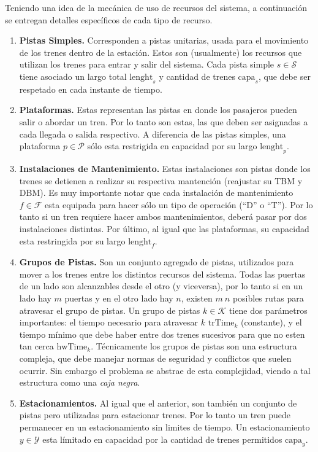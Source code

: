 \documentclass[letter, 10pt]{article}
\begin{document}
\begin{description}
	Teniendo una idea de la mecánica de uso de recursos del sistema, a continuación se entregan detalles específicos de cada tipo de recurso.
	\begin{enumerate}
		\item \textbf{Pistas Simples.} Corresponden a pistas unitarias, usada para el movimiento de los trenes dentro de la estación. Estos son (usualmente) los recursos que utilizan los trenes para entrar y salir del sistema. Cada pista simple $s \in \mathcal{S}$ tiene asociado un largo total $\text{lenght}_s$ y cantidad de trenes $\text{capa}_s$,
		que debe ser respetado en cada instante de tiempo.
		\item \textbf{Plataformas.} Estas representan las pistas en donde los pasajeros pueden salir o abordar un tren. Por lo tanto son estas, las que deben ser asignadas a cada llegada o salida respectivo. A diferencia de las pistas simples, una plataforma $p \in \mathcal{P}$ sólo esta restrigida en capacidad por su largo $\text{lenght}_p$.
		\item \textbf{Instalaciones de Mantenimiento.} Estas instalaciones son pistas donde los trenes se detienen a realizar su respectiva mantención (reajustar su TBM y DBM). Es muy importante notar que cada instalación de mantenimiento $f \in \mathcal{F}$ esta equipada para hacer sólo un tipo de operación (``D'' o ``T''). Por lo tanto si un tren requiere hacer ambos mantenimientos, deberá pasar por dos instalaciones distintas. Por último, al igual que las plataformas, su capacidad esta restringida por su largo $\text{lenght}_f$.
		\item \textbf{Grupos de Pistas.} Son un conjunto agregado de pistas, utilizados para mover a los trenes entre los distintos recursos del sistema. Todas las puertas de un lado son alcanzables desde el otro (y viceversa), por lo tanto si en un lado hay $m$ puertas y en el otro lado hay $n$, existen $m\ n$ posibles rutas para atravesar el grupo de pistas. Un grupo de pistas $k \in \mathcal{K}$ tiene dos parámetros importantes: el tiempo necesario para atravesar $k$ $\text{trTime}_k$ (constante), y el tiempo mínimo que debe haber entre dos trenes sucesivos para que no esten tan cerca $\text{hwTime}_k$. Técnicamente los grupos de pistas son una estructura compleja, que debe manejar normas de seguridad y conflictos que suelen ocurrir. Sin embargo el problema se abstrae de esta complejidad, viendo a tal estructura como una \textit{caja negra}. 
		\item \textbf{Estacionamientos.} Al igual que el anterior, son también un conjunto de pistas pero utilizadas para estacionar trenes. Por lo tanto un tren puede permanecer en un estacionamiento sin limites de tiempo. Un estacionamiento $y \in \mathcal{Y}$ esta límitado en capacidad por la cantidad de trenes permitidos $\text{capa}_y$.
	\end{enumerate}



\end{description}
\end{document}
